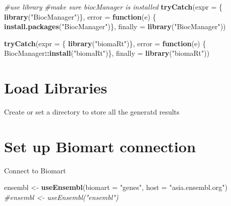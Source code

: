 \documentclass[
]{book}
\newenvironment{Shaded}{\begin{snugshade}}{\end{snugshade}}
\newcommand{\AttributeTok}[1]{\textcolor[rgb]{0.13,0.29,0.53}{#1}}
\newcommand{\CommentTok}[1]{\textcolor[rgb]{0.56,0.35,0.01}{\textit{#1}}}
\newcommand{\ControlFlowTok}[1]{\textcolor[rgb]{0.13,0.29,0.53}{\textbf{#1}}}
\newcommand{\FunctionTok}[1]{\textcolor[rgb]{0.13,0.29,0.53}{\textbf{#1}}}
\newcommand{\NormalTok}[1]{#1}
\newcommand{\OtherTok}[1]{\textcolor[rgb]{0.56,0.35,0.01}{#1}}
\newcommand{\SpecialCharTok}[1]{\textcolor[rgb]{0.81,0.36,0.00}{\textbf{#1}}}
\newcommand{\StringTok}[1]{\textcolor[rgb]{0.31,0.60,0.02}{#1}}
\begin{document}
\begin{Shaded}
\begin{Highlighting}[]
\CommentTok{\#use library}
\CommentTok{\#make sure biocManager is installed}
\FunctionTok{tryCatch}\NormalTok{(}\AttributeTok{expr =}\NormalTok{ \{ }\FunctionTok{library}\NormalTok{(}\StringTok{"BiocManager"}\NormalTok{)\}, }
         \AttributeTok{error =} \ControlFlowTok{function}\NormalTok{(e) \{ }
           \FunctionTok{install.packages}\NormalTok{(}\StringTok{"BiocManager"}\NormalTok{)\}, }
         \AttributeTok{finally =} \FunctionTok{library}\NormalTok{(}\StringTok{"BiocManager"}\NormalTok{))}


\FunctionTok{tryCatch}\NormalTok{(}\AttributeTok{expr =}\NormalTok{ \{ }\FunctionTok{library}\NormalTok{(}\StringTok{"biomaRt"}\NormalTok{)\}, }
         \AttributeTok{error =} \ControlFlowTok{function}\NormalTok{(e) \{ }
\NormalTok{           BiocManager}\SpecialCharTok{::}\FunctionTok{install}\NormalTok{(}\StringTok{"biomaRt"}\NormalTok{)\}, }
         \AttributeTok{finally =} \FunctionTok{library}\NormalTok{(}\StringTok{"biomaRt"}\NormalTok{))}
\end{Highlighting}
\end{Shaded}

\hypertarget{load-libraries}{%
\section{Load Libraries}\label{load-libraries}}

Create or set a directory to store all the generatd results

\begin{Shaded}
\end{Shaded}

\hypertarget{set-up-biomart-connection}{%
\section{Set up Biomart connection}\label{set-up-biomart-connection}}

Connect to Biomart

\begin{Shaded}
\begin{Highlighting}[]
\NormalTok{ensembl }\OtherTok{\textless{}{-}} \FunctionTok{useEnsembl}\NormalTok{(}\AttributeTok{biomart =} \StringTok{"genes"}\NormalTok{, }\AttributeTok{host =} \StringTok{"asia.ensembl.org"}\NormalTok{)}
\CommentTok{\#ensembl \textless{}{-} useEnsembl("ensembl")}
\end{Highlighting}
\end{Shaded}
\end{document}
